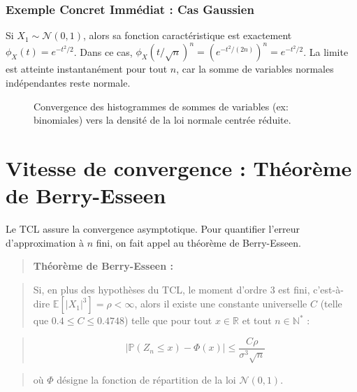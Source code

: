 \documentclass[11pt,a4paper]{article}
\begin{document}
\subsubsection{Exemple Concret Immédiat : Cas Gaussien}

Si $X_1 \sim \mathcal{N}(0, 1)$, alors sa fonction caractéristique est exactement $\phi_X(t) = e^{-t^2/2}$.
Dans ce cas, $\phi_X(t/\sqrt{n})^n = (e^{-t^2/(2n)})^n = e^{-t^2/2}$.
La limite est atteinte instantanément pour tout $n$, car la somme de variables normales indépendantes reste normale.


\begin{figure}[h]
\centering
{}
\caption{Convergence des histogrammes de sommes de variables (ex: binomiales) vers la densité de la loi normale centrée réduite.}
\end{figure}


\section{Vitesse de convergence : Théorème de Berry-Esseen}

Le TCL assure la convergence asymptotique. Pour quantifier l'erreur d'approximation à $n$ fini, on fait appel au théorème de Berry-Esseen.

\begin{quote}\textbf{Théorème de Berry-Esseen :}\end{quote}
\begin{quote}Si, en plus des hypothèses du TCL, le moment d'ordre 3 est fini, c'est-à-dire $\mathbb{E}[|X_1|^3] = \rho < \infty$, alors il existe une constante universelle $C$ (telle que $0.4 \le C \le 0.4748$) telle que pour tout $x \in \mathbb{R}$ et tout $n \in \mathbb{N}^*$ :\end{quote}
\begin{quote}$$\left| \mathbb{P}(Z_n \le x) - \Phi(x) \right| \le \frac{C \rho}{\sigma^3 \sqrt{n}}$$\end{quote}
\begin{quote}où $\Phi$ désigne la fonction de répartition de la loi $\mathcal{N}(0, 1)$.\end{quote}
\end{document}
